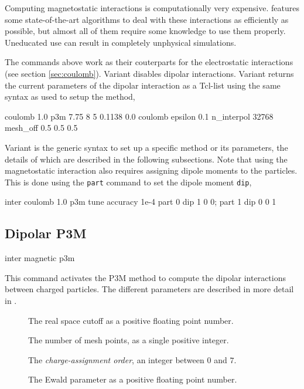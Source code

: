 Computing magnetostatic interactions is computationally very
expensive.  \es{} features some state-of-the-art algorithms to deal
with these interactions as efficiently as possible, but almost all of
them require some knowledge to use them properly.  Uneducated use can
result in completely unphysical simulations.

The commands above work as their couterparts for the electrostatic
interactions (see section \vref{sec:coulomb}).  Variant 
disables dipolar interactions.  Variant  returns the
current parameters of the dipolar interaction as a Tcl-list using the
same syntax as used to setup the method, \eg
\begin{tclcode}
  {coulomb 1.0 p3m 7.75 8 5 0.1138 0.0}
  {coulomb epsilon 0.1 n_interpol 32768 mesh_off 0.5 0.5 0.5}
\end{tclcode}

Variant  is the generic syntax to set up a specific method
or its parameters, the details of which are described in the following
subsections.  Note that using the magnetostatic interaction also
requires assigning dipole moments to the particles.  This is done
using the \texttt{part} command to set the dipole moment \texttt{dip},
\eg
\begin{tclcode}
  inter coulomb 1.0 p3m tune accuracy 1e-4
  part 0 dip 1 0 0; part 1 dip 0 0 1
\end{tclcode}

\subsection{Dipolar P3M}

\begin{essyntax}
  inter magnetic  p3m 
     
  \begin{features}
  \end{features}
\end{essyntax}

This command activates the P3M method to compute the dipolar
interactions between charged particles.  The different parameters are
described in more detail in \cite{cerda08a}.
\begin{description}
\item[] The real space cutoff as a positive
  floating point number.
\item[] The number of mesh points, as a single positive
  integer.
\item[] The \emph{charge-assignment order}, an integer
  between $0$ and $7$.
\item[] The Ewald parameter as a positive floating point
  number.
\end{description}

